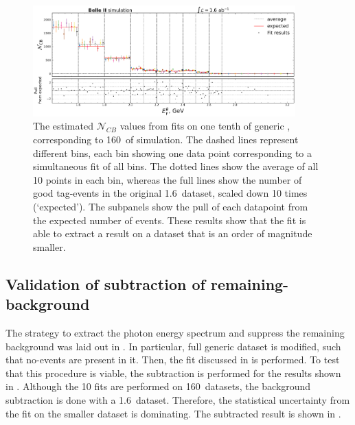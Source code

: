 \begin{figure}[htbp!]
    \includegraphics[width=0.9\textwidth]{figures/mc_validation/extracted_signal_generic_mc.pdf}
    \caption{\label{fig:extracted_validation_mc}The estimated $\mathcal{N}_{CB}$ values from fits on one tenth of generic \MC, corresponding to 160~\invfb of simulation.
    The dashed lines represent different \EB bins, each bin showing one data point corresponding to a simultaneous fit of all \EB bins.
    The dotted lines show the average of all 10 points in each bin, whereas the full lines show the number of good tag-\B events in the original 1.6~\invab dataset, scaled down 10 times (`expected').
    The subpanels show the pull of each datapoint from the expected number of events.
    These results show that the fit is able to extract a result on a dataset that is an order of magnitude smaller.
    }
\end{figure}

\subsection{Validation of subtraction of remaining-\texorpdfstring{\BB}{BB} background}\label{sec:background_subtraction_validation_mc}

The strategy to extract the \BtoXsgamma photon energy spectrum and suppress the remaining \BB background was laid out in .
In particular, full generic \MC dataset is modified, such that no-\BtoXsgamma events are present in it.
Then, the \Mbc fit discussed in  is performed.
To test that this procedure is viable, the subtraction is performed for the results shown in .
Although the 10 fits are performed on 160~\invfb datasets, the background subtraction is done with a 1.6~\invab dataset.
Therefore, the statistical uncertainty from the fit on the smaller dataset is dominating.
The subtracted result is shown in .

